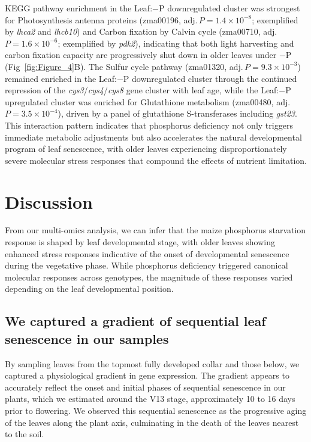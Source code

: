 \documentclass[9pt,twocolumn,twoside]{rilabRxiv}
\begin{document}
KEGG pathway enrichment in the Leaf:$-$P downregulated cluster was strongest for Photosynthesis antenna proteins (zma00196, adj.\,$P = 1.4\times 10^{-8}$; exemplified by \textit{lhca2} and \textit{lhcb10}) and Carbon fixation by Calvin cycle (zma00710, adj.\,$P = 1.6\times 10^{-6}$; exemplified by \textit{pdk2}), indicating that both light harvesting and carbon fixation capacity are progressively shut down in older leaves under $-$P (Fig~\ref{fig:Figure_4}B).
The Sulfur cycle pathway (zma01320, adj.\,$P = 9.3\times 10^{-3}$) remained enriched in the Leaf:$-$P downregulated cluster through the continued repression of the \textit{cys3}/\textit{cys4}/\textit{cys8} gene cluster with leaf age, while the Leaf:$-$P upregulated cluster was enriched for Glutathione metabolism (zma00480, adj.\,$P = 3.5\times 10^{-4}$), driven by a panel of glutathione S-transferases including \textit{gst23}.
This interaction pattern indicates that phosphorus deficiency not only triggers immediate metabolic adjustments but also accelerates the natural developmental program of leaf senescence, with older leaves experiencing disproportionately severe molecular stress responses that compound the effects of nutrient limitation.

\section{Discussion}

From our multi-omics analysis, we can infer that the maize phosphorus starvation response is shaped by leaf developmental stage, with older leaves showing enhanced stress responses indicative of the onset of developmental senescence during the vegetative phase.
While phosphorus deficiency triggered canonical molecular responses across genotypes, the magnitude of these responses varied depending on the leaf developmental position.

\subsection*{We captured a gradient of sequential leaf senescence in our samples}

By sampling leaves from the topmost fully developed collar and those below, we captured a physiological gradient in gene expression. 
The gradient appears to accurately reflect the onset and initial phases of sequential senescence in our plants, which we estimated around the V13 stage, approximately 10 to 16 days prior to flowering. 
We observed this sequential senescence as the progressive aging of the leaves along the plant axis, culminating in the death of the leaves nearest to the soil.
\end{document}
